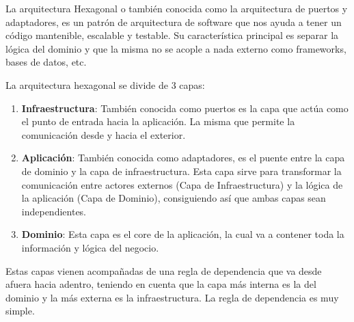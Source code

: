 La arquitectura Hexagonal o también conocida como la arquitectura de puertos y adaptadores, es un patrón de arquitectura de software que nos ayuda a tener un código mantenible, escalable y testable. Su característica principal es separar la lógica del dominio y que la misma no se acople a nada externo como frameworks, bases de datos, etc.

La arquitectura hexagonal se divide de 3 capas:
\begin{enumerate}
    \item \textbf{Infraestructura}: También conocida como puertos es la capa que actúa como el punto de entrada hacia la aplicación. La misma que permite la comunicación desde y hacia el exterior.
    \item \textbf{Aplicación}: También conocida como adaptadores, es el puente entre la capa de dominio y la capa de infraestructura. Esta capa sirve para transformar la comunicación entre actores externos (Capa de Infraestructura) y la lógica de la aplicación (Capa de Dominio), consiguiendo así que ambas capas sean independientes.
    \item \textbf{Dominio}: Esta capa es el core de la aplicación, la cual va a contener toda la información y lógica del negocio.   
\end{enumerate}


Estas capas vienen acompañadas de una regla de dependencia que va desde afuera hacia adentro, teniendo en cuenta que la capa más interna es la del dominio y la más externa es la infraestructura. La regla de dependencia es muy simple. 